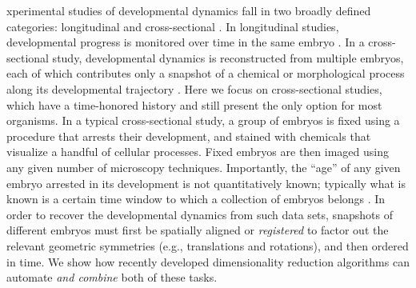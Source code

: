 \documentclass{pnastwo}
\begin{document}
\begin{article}





xperimental studies of developmental dynamics fall in two broadly defined categories: longitudinal and cross-sectional \cite{diggle2002analysis}.
%
In longitudinal studies, developmental progress is monitored over time in the same embryo \cite{roelens2013live, keller2013imaging}.
%
In a cross-sectional study, developmental dynamics is reconstructed from multiple embryos, each of which contributes only a snapshot of a chemical or morphological process along its developmental trajectory \cite{jaeger2004dynamic, peter2011gene, fowlkes2008quantitative}.
%
Here we focus on cross-sectional studies, which have a time-honored history and still present the only option for most organisms.
%
In a typical cross-sectional study, a group of embryos is fixed using a procedure that arrests their development, and stained with chemicals that visualize a handful of cellular processes.
%
Fixed embryos are then imaged using any given number of microscopy techniques.
%
Importantly, the ``age'' of any given embryo arrested in its development is not quantitatively known; typically what is known is
a certain time window to which a collection of embryos belongs \cite{ng2012large, richardson2014emage, castro2009automatic}.
%
In order to recover the developmental dynamics from such data sets, snapshots of different embryos must first be spatially aligned or {\em registered} to factor out the relevant geometric symmetries (e.g., translations and rotations), and then ordered in time.
%
We show how recently developed dimensionality reduction algorithms can automate {\it and combine} both of these tasks.


\end{article}
\end{document}
